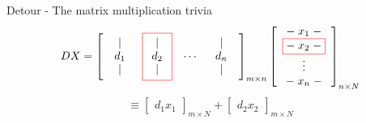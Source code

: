 \documentclass{beamer}
\begin{document}
\begin{frame}{Detour - The matrix multiplication trivia}
    \[
    DX=
    \left[
    \begin{array}{cccc}
    \begin{array}{c}|\\ d_1\\ |\end{array} &
    \fcolorbox{red}{white}{$\begin{array}{c}|\\ d_2\\ |\end{array}$} &
    \cdots &
    \begin{array}{c}|\\ d_n\\ |\end{array}
    \end{array}
    \right]_{m\times n}
    \left[
    \begin{array}{c}
    {-}\;x_1\;{-} \\
    \fcolorbox{red}{white}{${-}\;x_2\;{-}$} \\
    \vdots \\
    {-}\;x_n\;{-}
    \end{array}
    \right]_{n\times N}
    \]
    \[
    \equiv
    \left[\begin{array}{c}d_1x_1\end{array}\right]_{m\times N}
    +
    \left[\begin{array}{c}d_2x_2\end{array}\right]_{m\times N}
    \]
\end{frame}
\end{document}
